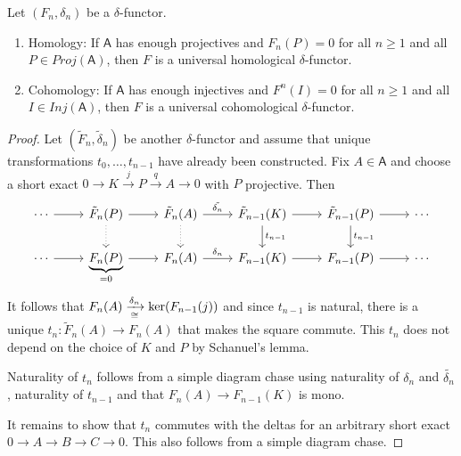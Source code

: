 \documentclass[fontsize=11pt,fleqn,a4paper]{scrartcl}
\begin{document}
\begin{lemma}
Let $(F_n,\delta_n)$ be a $\delta$-functor.
\begin{multicols}{2}
\begin{enumerate}
\item Homology: If $\mathsf{A}$ has enough projectives and $F_n(P) = 0$ for all $n\geq 1$ and all $P\in Proj(\mathsf{A})$, then $F$ is a universal homological $\delta$-functor.
\item Cohomology: If $\mathsf{A}$ has enough injectives and $F^n(I) = 0$ for all $n\geq 1$ and all $I\in Inj(\mathsf{A})$, then $F$ is a universal cohomological $\delta$-functor.
\end{enumerate}
\end{multicols}
\end{lemma}
\begin{proof}
Let $(\tilde{F}_n,\tilde{\delta}_n)$ be another $\delta$-functor and assume that unique transformations $t_0,\ldots,t_{n-1}$ have already been constructed. Fix $A\in\mathsf{A}$ and choose a short exact $0\to K\xrightarrow{j} P \xrightarrow{q} A\to 0$ with $P$ projective. Then
\[\begin{tikzcd}
\cdots \ar[r] & \tilde{F}_n(P) \ar[r]\ar[d,dotted]  & \tilde{F}_n(A) \ar[r,"\tilde{\delta_n}"]\ar[d,dotted]  & \tilde{F}_{n-1}(K) \ar[r]\ar[d,"t_{n-1}"]  & \tilde{F}_{n-1}(P)\ar[d,"t_{n-1}"] \ar[r] & \cdots \\
\cdots \ar[r] & \underbrace{F_n(P)}_{=0} \ar[r] & F_n(A) \ar[r,"\delta_n"] & F_{n-1}(K) \ar[r] & F_{n-1}(P) \ar[r] & \cdots 
\end{tikzcd}\]
It follows that $F_n(A) \xrightarrow[\cong]{\delta_n} \ker(F_{n-1}(j))$ and since $t_{n-1}$ is natural, there is a unique $t_n: \tilde{F}_n(A) \to F_n(A)$ that makes the square commute. This $t_n$ does not depend on the choice of $K$ and $P$ by Schanuel's lemma.

Naturality of $t_n$ follows from a simple diagram chase using naturality of $\delta_n$ and $\tilde{\delta_n}$, naturality of $t_{n-1}$ and that $F_n(A) \to F_{n-1}(K)$ is mono.

It remains to show that $t_n$ commutes with the deltas for an arbitrary short exact $0\to A\to B\to C\to 0$. This also follows from a simple diagram chase.
\end{proof}
\end{document}
